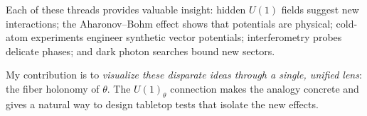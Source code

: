Each of these threads provides valuable insight: hidden $U(1)$ fields suggest new interactions;
the Aharonov--Bohm effect shows that potentials are physical; cold-atom experiments engineer 
synthetic vector potentials; interferometry probes delicate phases; and dark photon searches 
bound new sectors.

My contribution is to \emph{visualize these disparate ideas through a single, unified lens}: 
the fiber holonomy of $\theta$. The $U(1)_\theta$ connection makes the analogy concrete and 
gives a natural way to design tabletop tests that isolate the new effects.
